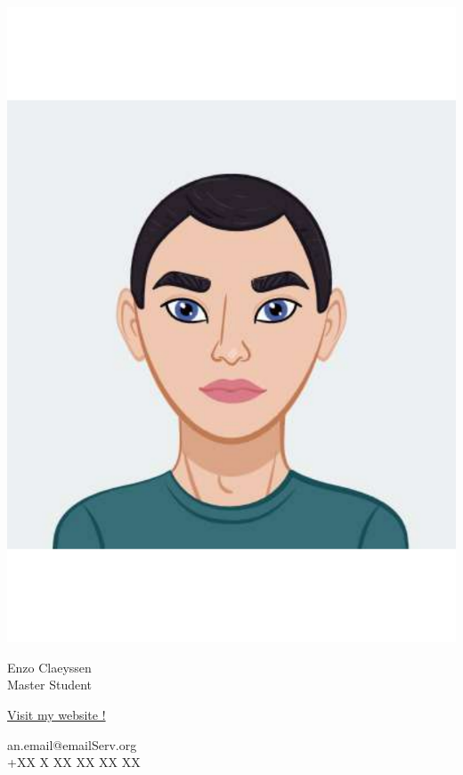 \documentclass{article}
\begin{document}
\centering \includegraphics[width=.15\linewidth]{logo}\\[5pt]
\parbox{2in}{\Large \centering Enzo Claeyssen\\[1pt]
\normalsize Master Student}

\vfill
\raggedright
\begin{multicols}{2}
\href{https://enzo-claeyssen.github.io}{Visit my website !}

\columnbreak
\raggedleft
an.email@emailServ.org\\
+XX X XX XX XX XX%
\end{multicols}%
\end{document}
